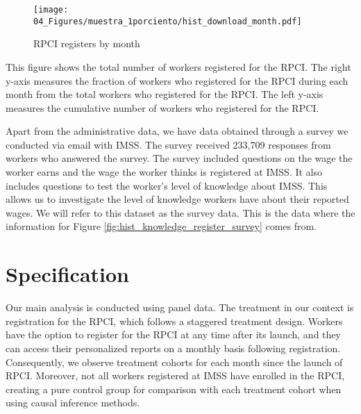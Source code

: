 \documentclass[10pt, oneside]{book}
\begin{document}
\begin{figure}[H]
    \caption{RPCI registers by month}
    \label{hist_download}
    \begin{center}
    \texttt{[image: 04\_Figures/muestra\_1porciento/hist\_download\_month.pdf]}
    \end{center}
\end{figure}
\scriptsize{
\noindent This figure shows the total number of workers registered for the RPCI. The right y-axis measures the fraction of workers who registered for the RPCI during each month from the total workers who registered for the RPCI. The left y-axis measures the cumulative number of workers who registered for the RPCI.
} \\

\normalsize

Apart from the administrative data, we have data obtained through a survey we conducted via email with IMSS. The survey received 233,709 responses from workers who answered the survey. The survey included questions on the wage the worker earns and the wage the worker thinks is registered at IMSS. It also includes questions to test the worker's level of knowledge about IMSS. This allows us to investigate the level of knowledge workers have about their reported wages. We will refer to this dataset as the survey data. This is the data where the information for Figure \ref{fig:hist_knowledge_register_survey} comes from.


\chapter{Specification} \label{specification}

Our main analysis is conducted using panel data. The treatment in our context is registration for the RPCI, which follows a staggered treatment design. Workers have the option to register for the RPCI at any time after its launch, and they can access their personalized reports on a monthly basis following registration. Consequently, we observe treatment cohorts for each month since the launch of RPCI. Moreover, not all workers registered at IMSS have enrolled in the RPCI, creating a pure control group for comparison with each treatment cohort when using causal inference methods. \\
\end{document}
